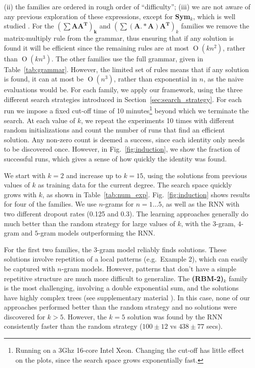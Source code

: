 \documentclass{article} %
\newcommand{\fig}[1]{Fig.~\ref{fig:#1}}
\newcommand{\tab}[1]{Table~\ref{tab:#1}}
\newcommand{\secc}[1]{Section~\ref{sec:#1}}
\newcommand{\BigO}[1]{\ensuremath{\operatorname{O}\left(#1\right)}}
\begin{document}
(ii) the families are ordered in rough order of ``difficulty''; (iii)
we are not aware of any previous exploration of these expressions,
except for {\bf Sym$_k$}, which is well studied \cite{stanley2011enumerative}. 
For the
$\mathbf{(\sum AA^T)_k}$ and $(\mathbf{\sum (A.*A)A^T})_k$ families we
remove the matrix-multiply rule from the grammar, thus ensuring that if any solution is
found it will be efficient since the remaining rules are at most
$\BigO{kn^2}$, rather than $\BigO{kn^3}$. The other families use the full
grammar, given in \tab{grammar}. However, the limited set of rules
means that if any solution is found, it can at most be $\BigO{n^3}$,
rather than exponential in $n$, as the naive evaluations would be. 
For each family, we apply our framework, using the three different
search strategies introduced in \secc{search_strategy}. 
For each run we impose a
fixed cut-off time of 10 minutes\footnote{Running on a 3Ghz 16-core
  Intel Xeon. Changing the cut-off has little effect on the plots,
  since the search space grows exponentially fast.} beyond which we
terminate the search. At each value of $k$, we repeat the experiments
10 times with different random initializations and count the number of
runs that find an efficient solution. Any non-zero count is deemed a
success, since each identity only needs to be discovered once. However,
in \fig{induction}, we show the fraction of successful runs, which
gives a sense of how quickly the identity was found. 

We start with $k=2$ and increase up to $k=15$, using the solutions
from previous values of $k$ as training data for the current
degree. The search space quickly grows with $k$, as shown in
\tab{num_exp}. \fig{induction} shows results for four of the
families. We use $n$-grams for $n=1 \ldots 5$, as well as the RNN with
two different dropout rates (0.125 and 0.3). The learning approaches
generally do much better than the random strategy for large values of
$k$, with the $3$-gram, $4$-gram and $5$-gram models outperforming the
RNN. 

For the first two families, the $3$-gram model reliably finds
solutions. These solutions involve repetition of a local patterns
(e.g.~Example 2), which can easily be captured with $n$-gram
models. However, patterns that don't have a simple repetitive
structure are much more difficult to generalize. The {\bf (RBM-2)$_k$}
family is the most challenging, involving a double exponential sum,
and the solutions have highly complex trees (see supplementary
material \cite{arxiv}). In this case, none of our approaches performed better than
the random strategy and no solutions were discovered for
$k>5$. However, the $k=5$ solution was found by the RNN consistently
faster than the random strategy ($100 \pm 12$ vs $438 \pm 77$ secs).
\end{document}
